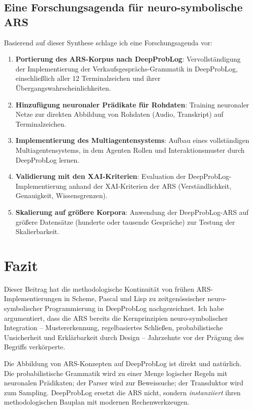 \documentclass[12pt,a4paper]{article}
\begin{document}
\subsection{Eine Forschungsagenda für neuro-symbolische ARS}

Basierend auf dieser Synthese schlage ich eine Forschungsagenda vor:

\begin{enumerate}
    \item \textbf{Portierung des ARS-Korpus nach DeepProbLog}: Vervollständigung 
    der Implementierung der Verkaufsgesprächs-Grammatik in DeepProbLog, 
    einschließlich aller 12 Terminalzeichen und ihrer Übergangswahrscheinlichkeiten.
    
    \item \textbf{Hinzufügung neuronaler Prädikate für Rohdaten}: Training 
    neuronaler Netze zur direkten Abbildung von Rohdaten (Audio, Transkript) 
    auf Terminalzeichen.
    
    \item \textbf{Implementierung des Multiagentensystems}: Aufbau eines 
    vollständigen Multiagentensystems, in dem Agenten Rollen und Interaktionsmuster 
    durch DeepProbLog lernen.
    
    \item \textbf{Validierung mit den XAI-Kriterien}: Evaluation der DeepProbLog-Implementierung 
    anhand der XAI-Kriterien der ARS (Verständlichkeit, Genauigkeit, Wissensgrenzen).
    
    \item \textbf{Skalierung auf größere Korpora}: Anwendung der DeepProbLog-ARS 
    auf größere Datensätze (hunderte oder tausende Gespräche) zur Testung der 
    Skalierbarkeit.
\end{enumerate}

\section{Fazit}

Dieser Beitrag hat die methodologische Kontinuität von frühen ARS-Implementierungen 
in Scheme, Pascal und Lisp zu zeitgenössischer neuro-symbolischer Programmierung 
in DeepProbLog nachgezeichnet. Ich habe argumentiert, dass die ARS bereits die 
Kernprinzipien neuro-symbolischer Integration – Mustererkennung, regelbasiertes 
Schließen, probabilistische Unsicherheit und Erklärbarkeit durch Design – 
Jahrzehnte vor der Prägung des Begriffs verkörperte.

Die Abbildung von ARS-Konzepten auf DeepProbLog ist direkt und natürlich. Die 
probabilistische Grammatik wird zu einer Menge logischer Regeln mit neuronalen 
Prädikaten; der Parser wird zur Beweissuche; der Transduktor wird zum Sampling. 
DeepProbLog ersetzt die ARS nicht, sondern \textit{instanziiert} ihren 
methodologischen Bauplan mit modernen Rechenwerkzeugen.
\end{document}
